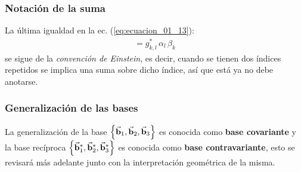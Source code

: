\documentclass[12pt]{beamer}
\begin{document}
\begin{frame}
\frametitle{Notación de la suma}
La última igualdad en la ec. (\ref{eq:ecuacion_01_13}):
\pause
\begin{align*}
= g_{k,l}^{*} \, \alpha_{l} \, \beta_{k}
\end{align*}
se sigue de la \emph{convención de Einstein}, es decir, cuando se tienen dos índices repetidos se implica una suma sobre dicho índice, así que está ya no debe anotarse.
\end{frame}
\begin{frame}
\frametitle{Generalización de las bases}
La generalización de la base $\left\{ \va{b}_{1}, \va{b}_{2}, \va{b}_{3} \right\}$ es conocida como \textbf{base covariante} \pause y la base recíproca $\left\{ \va{b}_{1}^{*}, \va{b}_{2}^{*}, \va{b}_{3}^{*} \right\}$ es conocida como \textbf{base contravariante}, esto se revisará más adelante junto con la interpretación geométrica de la misma.
\end{frame}
\end{document}
